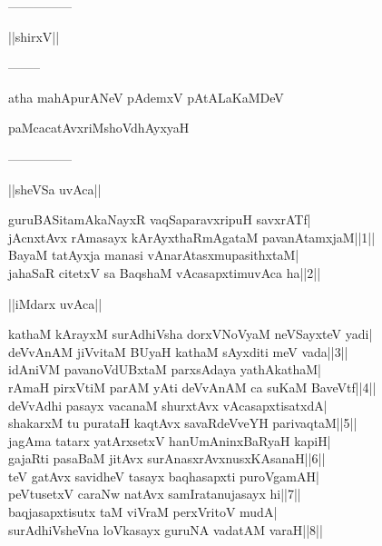 \documentclass{article}
\begin{document}
\begin{center}
---------------
\end{center}

\begin{center}
||shirxV||
\end{center}

\begin{center}
--------
\end{center}

\begin{center}
atha mahApurANeV pAdemxV pAtALaKaMDeV
\end{center}

\begin{center}
paMcacatAvxriMshoVdhAyxyaH
\end{center}

\begin{center}
---------------
\end{center}

\begin{center}
||sheVSa uvAca||
\end{center}

guruBASitamAkaNayxR vaqSaparavxripuH savxrATf|\\
jAcnxtAvx rAmasayx kArAyxthaRmAgataM pavanAtamxjaM||1||\\
BayaM tatAyxja manasi vAnarAtasxmupasithxtaM|\\
ja{ha}SaR citetxV sa BaqshaM vAcasapxtimuvAca ha||2||\\

\begin{center}
||iMdarx uvAca||
\end{center}

kathaM kArayxM surAdhiVsha dorxVNoVyaM neVSayxteV yadi|\\
deVvAnAM jiVvitaM BUyaH kathaM sAyxditi meV vada||3||\\
idAniVM pavanoVdUBxtaM parxsAdaya yathAkathaM|\\
rAmaH pirxVtiM parAM yAti deVvAnAM ca suKaM BaveVtf||4||\\
deVvAdhi pasayx vacanaM shurxtAvx vAcasapxtisatxdA|\\
shakarxM tu purataH kaqtAvx savaRdeVveYH parivaqtaM||5||\\
jagAma tatarx yatArxsetxV hanUmAninxBaRyaH kapiH|\\
gajaRti pasaBaM jitAvx surAnasxrAvxnusxKAsanaH||6||\\
teV gatAvx savidheV tasayx baqhasapxti puroVgamAH|\\
peVtusetxV caraNw natAvx samIratanujasayx hi||7||\\
baqjasapxtisutx taM viVraM perxVritoV mudA|\\
surAdhiVsheVna loVkasayx guruNA vadatAM varaH||8||\\
\end{document}
